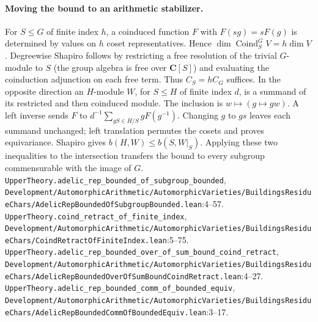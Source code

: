 \paragraph{Moving the bound to an arithmetic stabilizer.}
For $S\le G$ of finite index $h$, a coinduced function $F$ with $F(sg)=sF(g)$ is determined by values on $h$ coset representatives. Hence $\dim\operatorname{Coind}_S^G V=h\dim V$. Degreewise Shapiro follows by restricting a free resolution of the trivial $G$-module to $S$ (the group algebra is free over $\mathbf C[S]$) and evaluating the coinduction adjunction on each free term. Thus $C_S=hC_G$ suffices. In the opposite direction an $H$-module $W$, for $S\le H$ of finite index $d$, is a summand of its restricted and then coinduced module. The inclusion is $w\mapsto(g\mapsto gw)$. A left inverse sends $F$ to
$d^{-1}\sum_{gS\in H/S}gF(g^{-1})$. Changing $g$ to $gs$ leaves each summand unchanged; left translation permutes the cosets and proves equivariance. Shapiro gives $b(H,W)\le b(S,W|_S)$. Applying these two inequalities to the intersection transfers the bound to every subgroup commensurable with the image of $G$.
{\footnotesize\nolinkurl{UpperTheory.adelic_rep_bounded_of_subgroup_bounded}, \nolinkurl{Development/AutomorphicArithmetic/AutomorphicVarieties/BuildingsResidueChars/AdelicRepBoundedOfSubgroupBounded.lean}\allowbreak:4--57.} {\footnotesize\nolinkurl{UpperTheory.coind_retract_of_finite_index}, \nolinkurl{Development/AutomorphicArithmetic/AutomorphicVarieties/BuildingsResidueChars/CoindRetractOfFiniteIndex.lean}\allowbreak:5--75.} {\footnotesize\nolinkurl{UpperTheory.adelic_rep_bounded_over_of_sum_bound_coind_retract}, \nolinkurl{Development/AutomorphicArithmetic/AutomorphicVarieties/BuildingsResidueChars/AdelicRepBoundedOverOfSumBoundCoindRetract.lean}\allowbreak:4--27.} {\footnotesize\nolinkurl{UpperTheory.adelic_rep_bounded_comm_of_bounded_equiv}, \nolinkurl{Development/AutomorphicArithmetic/AutomorphicVarieties/BuildingsResidueChars/AdelicRepBoundedCommOfBoundedEquiv.lean}\allowbreak:3--17.}

